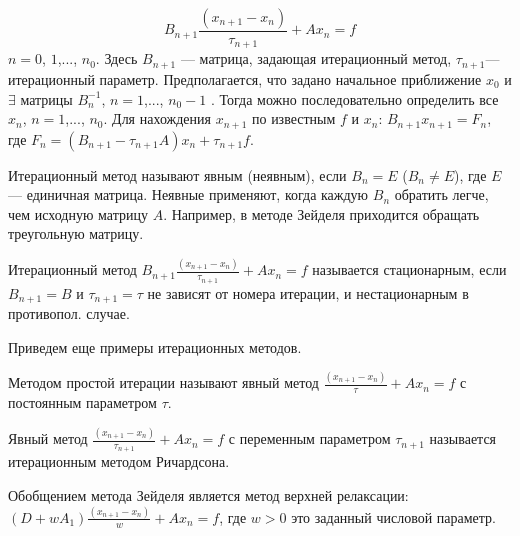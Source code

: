 \begin{equation*}
    B_{n+1}\frac{\left( x_{n+1}-x_{n}\right)}{\tau _{n+1}}+Ax_{n}=f
\end{equation*}
$n=0$, $1$,..., $n_{0}$.  Здесь $B_{n+1}$ — матрица, задающая итерационный метод, $\tau _{n+1}$— итерационный параметр. Предполагается, что задано начальное приближение $x_{0}$ и $\exists$ матрицы $B_{n}^{-1}$, $n=1$,..., $n_{0}-1$ . Тогда можно последовательно определить все $x_{n}$, $n=1$,..., $n_{0}$. Для нахождения $x_{n+1}$ по известным $f$ и $x_{n}$: $B_{n+1}x_{n+1}=F_{n}$, где $F_{n}=\left( B_{n+1}-\tau_{n+1}A\right)x_{n}+\tau_{n+1}f$. 
\par Итерационный метод называют явным (неявным), если $B_{n}=E$
($B_{n}\neq E$), где $E$— единичная матрица. Неявные применяют, когда каждую $B_{n}$ обратить легче, чем исходную матрицу $A$. Например, в методе Зейделя приходится обращать треугольную матрицу.
\par Итерационный метод $B_{n+1}\frac{\left( x_{n+1}-x_{n}\right)}{\tau _{n+1}}+Ax_{n}=f$ называется стационарным, если $B_{n+1}=B$ и $\tau_{n+1}=\tau$ не зависят от номера итерации, и нестационарным в противопол. случае.
\bigbreak
\par Приведем еще примеры итерационных методов. 
\par Методом простой итерации называют явный метод $\frac{\left( x_{n+1}-x_{n}\right)}{\tau}+Ax_{n}=f$ с постоянным параметром $\tau$. 
\par Явный метод $\frac{\left( x_{n+1}-x_{n}\right)}{\tau_{n+1}}+Ax_{n}=f$ с переменным параметром $\tau_{n+1}$ называется итерационным методом Ричардсона. 
\par Обобщением метода Зейделя является метод верхней релаксации: $\left( D+wA_{1}\right)\frac{\left( x_{n+1}-x_{n}\right)}{w}+Ax_n=f$, где $w>0$ это заданный числовой параметр.
